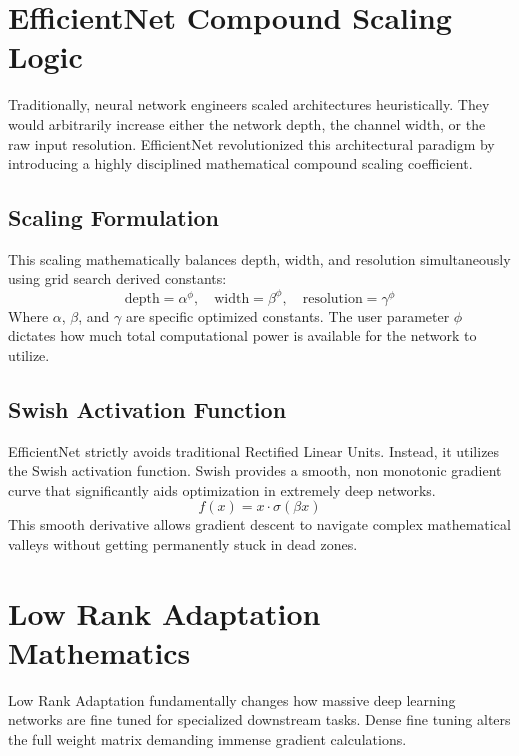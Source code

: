 \documentclass[12pt,a4paper]{report}
\begin{document}
\section{EfficientNet Compound Scaling Logic}
Traditionally, neural network engineers scaled architectures heuristically. They would arbitrarily increase either the network depth, the channel width, or the raw input resolution. EfficientNet revolutionized this architectural paradigm by introducing a highly disciplined mathematical compound scaling coefficient.

\subsection{Scaling Formulation}
This scaling mathematically balances depth, width, and resolution simultaneously using grid search derived constants:
\begin{equation}
\text{depth} = \alpha^\phi, \quad \text{width} = \beta^\phi, \quad \text{resolution} = \gamma^\phi
\end{equation}
Where $\alpha$, $\beta$, and $\gamma$ are specific optimized constants. The user parameter $\phi$ dictates how much total computational power is available for the network to utilize.

\subsection{Swish Activation Function}
EfficientNet strictly avoids traditional Rectified Linear Units. Instead, it utilizes the Swish activation function. Swish provides a smooth, non monotonic gradient curve that significantly aids optimization in extremely deep networks.
\begin{equation}
f(x) = x \cdot \sigma(\beta x)
\end{equation}
This smooth derivative allows gradient descent to navigate complex mathematical valleys without getting permanently stuck in dead zones.

\section{Low Rank Adaptation Mathematics}
Low Rank Adaptation fundamentally changes how massive deep learning networks are fine tuned for specialized downstream tasks. Dense fine tuning alters the full weight matrix demanding immense gradient calculations.
\end{document}
